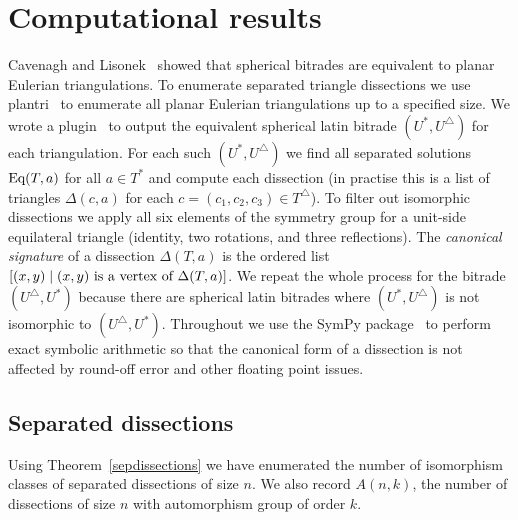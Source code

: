 \documentclass[12pt,amstags,fleqn]{article}
\theoremstyle{plain}
\theoremstyle{definition}
\theoremstyle{definition}
\def\ll{{\textstyle \ast}}
\def\rr{{\scriptscriptstyle \triangle}}
\newcommand{\opa}{\ll}
\newcommand{\opb}{\rr}
\newcommand{\eq}{\textnormal{Eq}}
\begin{document}
\section{Computational results}

Cavenagh and Lisonek~\cite{planareulerian} showed that spherical
bitrades are equivalent to planar Eulerian triangulations. To enumerate
separated triangle dissections we
use plantri~\cite{plantri} to enumerate all planar
Eulerian triangulations up to a specified size. We wrote a 
plugin~\cite{code} to output the equivalent spherical latin bitrade
$(U^{\opa}, U^{\opb})$ for each triangulation. For each such
$(U^{\opa},U^{\opb})$ we find all
separated solutions $\eq(T, a)$ for all $a \in T^{\opa}$ and compute each
dissection (in practise this is a list of triangles $\Delta(c,a)$ for
each $c = (c_1,c_2,c_3) \in T^{\rr}$).
To filter out isomorphic dissections we apply all six elements of
the symmetry group for a unit-side equilateral triangle (identity, two rotations,
and three reflections). The {\em canonical signature} of a dissection 
$\Delta(T,a)$ is
the ordered list $[(x,y) \mid (x,y) \textnormal{ is a
vertex of $\Delta(T,a)$}]$. We repeat the whole process for the bitrade $(U^{\opb},U^{\opa})$
because there are spherical latin bitrades where
$(U^{\opa},U^{\opb})$ is not isomorphic to $(U^{\opb},U^{\opa})$.  
Throughout we use the SymPy package~\cite{sympy} to perform
exact symbolic arithmetic so that the canonical form of a dissection is
not affected by round-off error and other floating point issues.


\subsection{Separated dissections}

Using Theorem~\ref{sepdissections}
we have enumerated the number of isomorphism classes of separated
dissections of size $n$. We also record $A(n,k)$, the number of dissections of 
size $n$ with automorphism group of order $k$.
\end{document}
